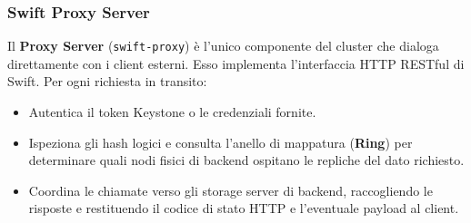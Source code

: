 \documentclass[11pt, a4paper]{article}
\begin{document}

\subsubsection{Swift Proxy Server}
Il \textbf{Proxy Server} (\texttt{swift-proxy}) è l'unico componente del cluster che dialoga direttamente con i client esterni. Esso implementa l'interfaccia HTTP RESTful di Swift. Per ogni richiesta in transito:
\begin{itemize}[noitemsep]
    \item Autentica il token Keystone o le credenziali fornite.
    \item Ispeziona gli hash logici e consulta l'anello di mappatura (\textbf{Ring}) per determinare quali nodi fisici di backend ospitano le repliche del dato richiesto.
    \item Coordina le chiamate verso gli storage server di backend, raccogliendo le risposte e restituendo il codice di stato HTTP e l'eventuale payload al client.
\end{itemize}
\end{document}
